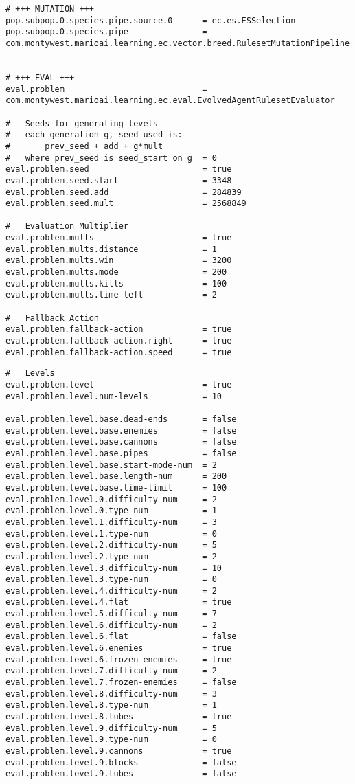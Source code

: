 \begin{appendices}
\begin{minipage}{0.9\linewidth}
\begin{lstlisting}
# +++ MUTATION +++
pop.subpop.0.species.pipe.source.0 		= ec.es.ESSelection
pop.subpop.0.species.pipe 				= com.montywest.marioai.learning.ec.vector.breed.RulesetMutationPipeline


# +++ EVAL +++
eval.problem							= com.montywest.marioai.learning.ec.eval.EvolvedAgentRulesetEvaluator

#	Seeds for generating levels
#	each generation g, seed used is:
#		prev_seed + add + g*mult
#   where prev_seed is seed_start on g  = 0
eval.problem.seed						= true
eval.problem.seed.start					= 3348
eval.problem.seed.add					= 284839
eval.problem.seed.mult					= 2568849

#	Evaluation Multiplier
eval.problem.mults						= true
eval.problem.mults.distance				= 1
eval.problem.mults.win					= 3200
eval.problem.mults.mode					= 200
eval.problem.mults.kills				= 100
eval.problem.mults.time-left			= 2

#	Fallback Action
eval.problem.fallback-action			= true
eval.problem.fallback-action.right		= true
eval.problem.fallback-action.speed		= true
\end{lstlisting}
\end{minipage}

\begin{minipage}{0.9\linewidth}
\begin{lstlisting}
#	Levels
eval.problem.level						= true
eval.problem.level.num-levels			= 10

eval.problem.level.base.dead-ends 		= false
eval.problem.level.base.enemies			= false
eval.problem.level.base.cannons			= false
eval.problem.level.base.pipes			= false
eval.problem.level.base.start-mode-num  = 2
eval.problem.level.base.length-num		= 200
eval.problem.level.base.time-limit		= 100
eval.problem.level.0.difficulty-num		= 2
eval.problem.level.0.type-num			= 1
eval.problem.level.1.difficulty-num		= 3
eval.problem.level.1.type-num			= 0
eval.problem.level.2.difficulty-num		= 5
eval.problem.level.2.type-num			= 2
eval.problem.level.3.difficulty-num		= 10
eval.problem.level.3.type-num			= 0
eval.problem.level.4.difficulty-num		= 2
eval.problem.level.4.flat				= true
eval.problem.level.5.difficulty-num		= 7
eval.problem.level.6.difficulty-num		= 2
eval.problem.level.6.flat				= false
eval.problem.level.6.enemies			= true
eval.problem.level.6.frozen-enemies		= true
eval.problem.level.7.difficulty-num		= 2
eval.problem.level.7.frozen-enemies		= false
eval.problem.level.8.difficulty-num		= 3
eval.problem.level.8.type-num			= 1
eval.problem.level.8.tubes				= true
eval.problem.level.9.difficulty-num		= 5
eval.problem.level.9.type-num			= 0
eval.problem.level.9.cannons			= true
eval.problem.level.9.blocks				= false
eval.problem.level.9.tubes				= false
\end{lstlisting}
\end{minipage}

\end{appendices}